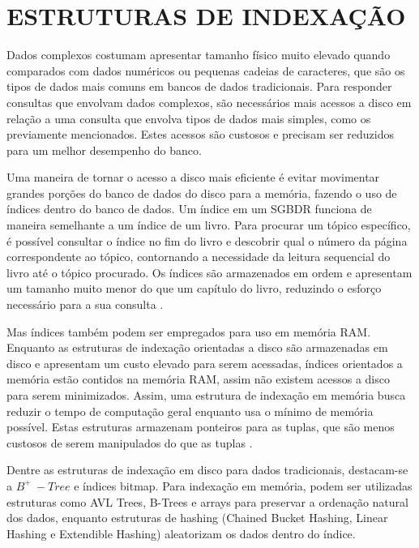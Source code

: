 \section{ESTRUTURAS DE INDEXAÇÃO}
\label{sec:index}

Dados complexos costumam apresentar tamanho físico muito elevado quando comparados com dados numéricos ou pequenas cadeias de caracteres, que são os tipos de dados
mais comuns em bancos de dados tradicionais. Para responder consultas que envolvam dados complexos, são necessários mais acessos a disco em relação a uma consulta
que envolva tipos de dados mais simples, como os previamente mencionados. Estes acessos são custosos e precisam ser reduzidos para um melhor desempenho do banco.\par 

Uma maneira de tornar o acesso a disco mais eficiente é evitar movimentar grandes porções do banco de dados do disco para a memória, fazendo o uso de índices dentro do banco de dados. 
Um índice em um SGBDR funciona de maneira semelhante a um índice de um livro. Para procurar um tópico específico, é possível consultar o índice no fim do livro e descobrir qual o número da página
correspondente ao tópico, contornando a necessidade da leitura sequencial do livro até o tópico procurado. Os índices são armazenados em ordem e apresentam um tamanho
muito menor do que um capítulo do livro, reduzindo o esforço necessário para a sua consulta \cite{Silberschatz2011}.\par

Mas índices também podem ser empregados para uso em memória RAM. Enquanto as estruturas de indexação orientadas a disco são armazenadas em disco e apresentam
um custo elevado para serem acessadas, índices orientados a memória estão contidos na memória RAM, assim não existem acessos
a disco para serem minimizados. Assim, uma estrutura de indexação em memória busca reduzir o tempo de computação geral enquanto usa
o mínimo de memória possível. Estas estruturas armazenam ponteiros para as tuplas, que são menos custosos de serem manipulados do que as tuplas \cite{Lehman1986}.\par
				
Dentre as estruturas de indexação em disco para dados tradicionais, destacam-se a $B^{+}\ -Tree$ e índices bitmap. Para indexação em memória,
podem ser utilizadas estruturas como AVL Trees, B-Trees e arrays para preservar a ordenação natural dos dados, enquanto estruturas de hashing
(Chained Bucket Hashing, Linear Hashing e Extendible Hashing) aleatorizam os dados dentro do índice.

